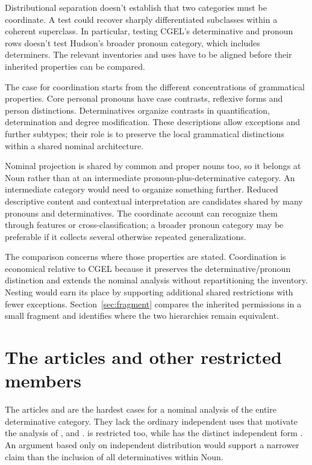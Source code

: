 \documentclass[12pt]{article}
\begin{document}
Distributional separation doesn't establish that two categories must be coordinate. A test could recover sharply differentiated subclasses within a coherent superclass. In particular, testing CGEL's determinative and pronoun rows doesn't test Hudson's broader pronoun category, which includes determiners. The relevant inventories and uses have to be aligned before their inherited properties can be compared.

The case for coordination starts from the different concentrations of grammatical properties. Core personal pronouns have case contrasts, reflexive forms and person distinctions. Determinatives organize contrasts in quantification, determination and degree modification. These descriptions allow exceptions and further subtypes; their role is to preserve the local grammatical distinctions within a shared nominal architecture.

Nominal projection is shared by common and proper nouns too, so it belongs at Noun rather than at an intermediate pronoun-plus-determinative category. An intermediate category would need to organize something further. Reduced descriptive content and contextual interpretation are candidates shared by many pronouns and determinatives. The coordinate account can recognize them through features or cross-classification; a broader pronoun category may be preferable if it collects several otherwise repeated generalizations.

The comparison concerns where those properties are stated. Coordination is economical relative to CGEL because it preserves the determinative/pronoun distinction and extends the nominal analysis without repartitioning the inventory. Nesting would earn its place by supporting additional shared restrictions with fewer exceptions. Section~\ref{sec:fragment} compares the inherited permissions in a small fragment and identifies where the two hierarchies remain equivalent.

\section{The articles and other restricted members}\label{sec:articles}

The articles  and  are the hardest cases for a nominal analysis of the entire determinative category. They lack the ordinary independent uses that motivate the analysis of ,  and .  is restricted too, while  has the distinct independent form  \citep[371--372, 410--411]{huddleston2002}. An argument based only on independent distribution would support a narrower claim than the inclusion of all determinatives within Noun.
\end{document}
